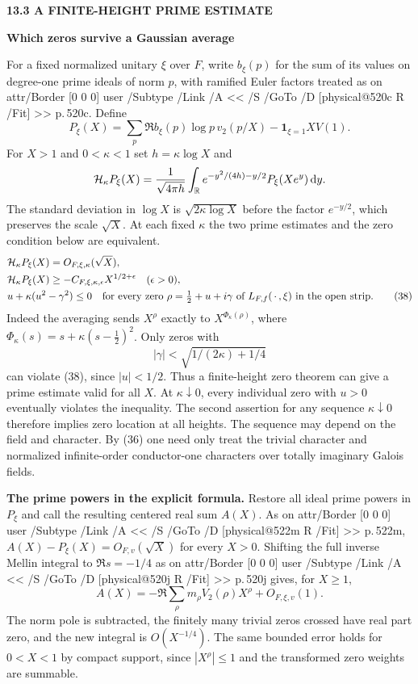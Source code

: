 \documentclass[11pt,letterpaper]{article}
\makeatletter
\newcommand{\rightmarktext}{}
\newcommand{\printfolio}{}
\newcommand{\leaf}[4]{\clearpage\gdef\printfolio{#1}\gdef\rightmarktext{#2}%
  {\small\sffamily\bfseries\color{ink}#3\par}\vspace{3pt}%
  {\LARGE\bfseries #4\par}\vspace{5pt}}
\newcommand{\point}[1]{\par\smallskip\textbf{#1.}\enspace\ignorespaces}
\newcommand{\R}{\mathbb R}
\newcommand{\dd}{\,\mathrm d}
\newcommand{\MusicPDFPageRef}[1]{\pdfpageref\csname physical@#1\endcsname\space\space 0 R}
\newcommand{\pagelink}[2]{\leavevmode\pdfstartlink attr{/Border [0 0 0]} user{%
  /Subtype /Link /A << /S /GoTo /D [\MusicPDFPageRef{#1} /Fit] >>}%
  {\color{ink}#2}\pdfendlink}
\newcommand{\pg}[1]{\pagelink{#1}{p.\,#1}}
\makeatother
\begin{document}
\leaf{522p}{Logarithmic averages}{13.3 \quad A FINITE-HEIGHT PRIME ESTIMATE}{Which zeros survive a Gaussian average}
For a fixed normalized unitary $\xi$ over $F$, write $b_\xi(p)$ for
the sum of its values on degree-one prime ideals of norm $p$, with
ramified Euler factors treated as on \pg{520c}. Define
\[
 P_\xi(X)=\sum_p\Re b_\xi(p)\log p\,v_2(p/X)
                      -\mathbf1_{\xi=1}X V(1).
\]
For $X>1$ and $0<\kappa<1$ set $h=\kappa\log X$ and
\[
  {\cal H}_\kappa P_\xi(X)=\frac1{\sqrt{4\pi h}}\int_\R
       e^{-y^2/(4h)-y/2}P_\xi(Xe^y)\dd y .
\]
The standard deviation in $\log X$ is $\sqrt{2\kappa\log X}$ before
the factor $e^{-y/2}$, which preserves the scale $\sqrt X$. At each
fixed $\kappa$ the two prime estimates and the zero condition below are equivalent.
\begin{align*}
 &{\cal H}_\kappa P_\xi(X)=O_{F,\xi,\kappa}(\sqrt X),\\
 &{\cal H}_\kappa P_\xi(X)\ge -C_{F,\xi,\kappa,\epsilon}
                          X^{1/2+\epsilon}\quad(\epsilon>0),\\
 &u+\kappa(u^2-\gamma^2)\le0\quad\text{for every zero }
        \rho=\tfrac12+u+i\gamma\text{ of }L_{F,f}
        (\,\cdot\,,\xi)\text{ in the open strip}. \tag{38}
\end{align*}
Indeed the averaging sends $X^\rho$ exactly to $X^{\Phi_\kappa(\rho)}$,
where $\Phi_\kappa(s)=s+\kappa(s-\tfrac12)^2$. Only zeros with
\[
              |\gamma|<\sqrt{1/(2\kappa)+1/4}
\]
can violate (38), since $|u|<1/2$. Thus a finite-height zero theorem
can give a prime estimate valid for all $X$. At $\kappa\downarrow0$,
every individual zero with $u>0$ eventually violates the inequality.
The second assertion for any sequence $\kappa\downarrow0$ therefore
implies zero location at all heights. The sequence may depend on the
field and character. By (36) one need only treat the trivial character
and normalized infinite-order conductor-one characters over totally
imaginary Galois fields.

\point{The prime powers in the explicit formula}
Restore all ideal prime powers in $P_\xi$ and call the resulting
centered real sum $A(X)$. As on \pg{522m},
$A(X)-P_\xi(X)=O_{F,v}(\sqrt X)$ for every $X>0$.
Shifting the full inverse Mellin integral to $\Re s=-1/4$ as on
\pg{520j} gives, for $X\ge1$,
\[
    A(X)=-\Re\sum_\rho m_\rho V_2(\rho)X^\rho+O_{F,\xi,v}(1).
\]
The norm pole is subtracted, the finitely many trivial zeros crossed
have real part zero, and the new integral is $O(X^{-1/4})$.
The same bounded error holds for $0<X<1$ by compact support, since
$|X^\rho|\le1$ and the transformed zero weights are summable.
\end{document}
